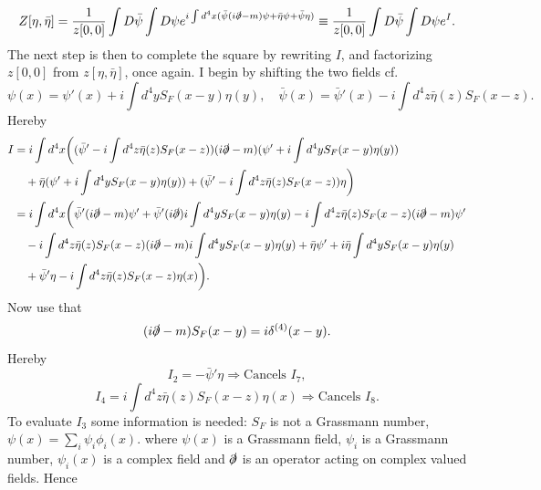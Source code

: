 \begin{equation}
		Z[\eta,\bar{\eta}]=\frac{1}{z[0,0]}\int D\bar{\psi}\int D\psi e^{i\int d^4x(\bar{\psi}(i\slashed \partial -m)\psi+\bar{\eta}\psi+\bar{\psi}\eta)}\equiv\frac{1}{z[0,0]}\int D\bar{\psi}\int D\psi e^{I}.
\end{equation} 	
The next step is then to complete the square by rewriting $I$, and factorizing $z[0,0]$ from $z[\eta,\bar{\eta}]$, once again. I begin by shifting the two fields cf.
\begin{equation}
	\psi(x)=\psi'(x)+i\int d^4yS_F(x-y)\eta(y), \quad \bar{\psi}(x)=\bar{\psi}'(x)-i\int d^4z\bar{\eta}(z)S_F(x-z).
\end{equation} 
Hereby
\begin{equation}
	\begin{split}
		I&=i\int d^4x\bigg((\bar{\psi}'-i\int d^4z\bar{\eta}(z)S_F(x-z))(i\slashed \partial -m)(\psi'+i\int d^4yS_F(x-y)\eta(y))\\
		&\quad+\bar{\eta}(\psi'+i\int d^4yS_F(x-y)\eta(y))+(\bar{\psi}'-i\int d^4z\bar{\eta}(z)S_F(x-z))\eta\bigg)\\
		&=i\int d^4x\bigg(\bar{\psi}'(i\slashed \partial-m)\psi'+\bar{\psi}'(i\slashed \partial)i\int d^4yS_F(x-y)\eta(y)-i\int d^4z\bar{\eta}(z)S_F(x-z)(i\slashed \partial -m)\psi'\\
		&\quad-i\int d^4z\bar{\eta}(z)S_F(x-z)(i\slashed \partial-m)i\int d^4yS_F(x-y)\eta(y)+\bar{\eta}\psi'+i\bar{\eta}\int d^4yS_F(x-y)\eta(y)\\
		&\quad+\bar{\psi}'\eta-i\int d^4z\bar{\eta}(z)S_F(x-z)\eta(x)\bigg).\\
	\end{split}
\end{equation} 
Now use that
\begin{equation}
	(i\slashed \partial -m)S_F(x-y)=i\delta^{(4)}(x-y).
\end{equation} 	
Hereby
\begin{equation}
	I_2=-\bar{\psi}'\eta\Rightarrow \text{Cancels } I_7,
\end{equation} 	
\begin{equation}
	I_4=i\int d^4z\bar{\eta}(z)S_F(x-z)\eta(x)\Rightarrow \text{Cancels } I_8.
\end{equation} 
To evaluate $I_3$ some information is needed: $S_F$ is not a Grassmann number, $\psi(x)=\sum_i \psi_i\phi_i(x)$. where $\psi(x)$ is a Grassmann field, $\psi_i$ is a Grassmann number, $\psi_i(x)$ is a complex field and $\slashed \partial$ is an operator acting on complex valued fields. Hence
